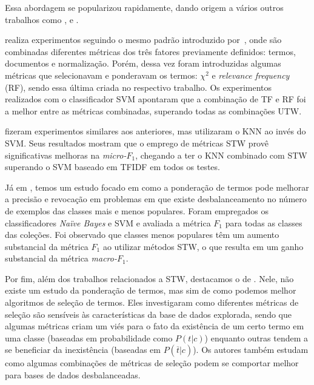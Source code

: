 Essa abordagem se popularizou rapidamente, dando origem a vários outros trabalhos como \cite{Lan05}, \cite{Batal09} e \cite{Liu09}.

\cite{Lan05} realiza experimentos seguindo o mesmo padrão introduzido por~\cite{Salton88}, onde são combinadas diferentes métricas dos três fatores previamente definidos: termos, documentos e normalização. 
Porém, dessa vez foram introduzidas algumas métricas que selecionavam e ponderavam os termos: $\chi^2$ e \textit{relevance frequency} (\textsc{RF}), sendo essa última criada no respectivo trabalho. Os experimentos realizados com o classificador \textsc{SVM} apontaram que a combinação de \textsc{TF} e \textsc{RF} foi a melhor entre as métricas combinadas, superando todas as combinações \textsc{UTW}. 

\cite{Batal09} fizeram experimentos similares aos anteriores, mas utilizaram o \textsc{KNN} ao invés do \textsc{SVM}. Seus resultados mostram que o emprego de métricas \textsc{STW} provê significativas melhoras na \textit{micro-$F_1$}, chegando a ter o \textsc{KNN} combinado com \textsc{STW} superando o \textsc{SVM} baseado em \textsc{TFIDF} em todos os testes.

Já em \cite{Liu09}, temos um estudo focado em como 
 a ponderação de termos pode melhorar a precisão e revocação em problemas em que existe desbalanceamento no número de exemplos das classes mais e menos populares. Foram empregados os classificadores \textit{Naïve Bayes} e \textsc{SVM} e avaliada a métrica $F_1$ para todas as classes das coleções. Foi observado que classes menos populares têm um aumento substancial da métrica $F_1$ ao utilizar métodos \textsc{STW}, o que resulta em um ganho substancial da métrica \textit{macro-$F_1$}.

Por fim, além dos trabalhos relacionados a \textsc{STW}, destacamos o de \cite{Tang05}. 
Nele, não existe um estudo da ponderação de termos, mas sim de como podemos melhor algoritmos de seleção de termos.
Eles investigaram como diferentes métricas de seleção são sensíveis às características da base de dados explorada, sendo que algumas métricas criam um viés para o fato da existência de um certo termo em uma classe (baseadas em probabilidade como $P(t|c)$) enquanto outras tendem a se beneficiar da inexistência (baseadas em $P(\overline{t}|c)$). Os autores também estudam como algumas combinações de métricas de seleção podem se comportar melhor para bases de dados desbalanceadas. 

